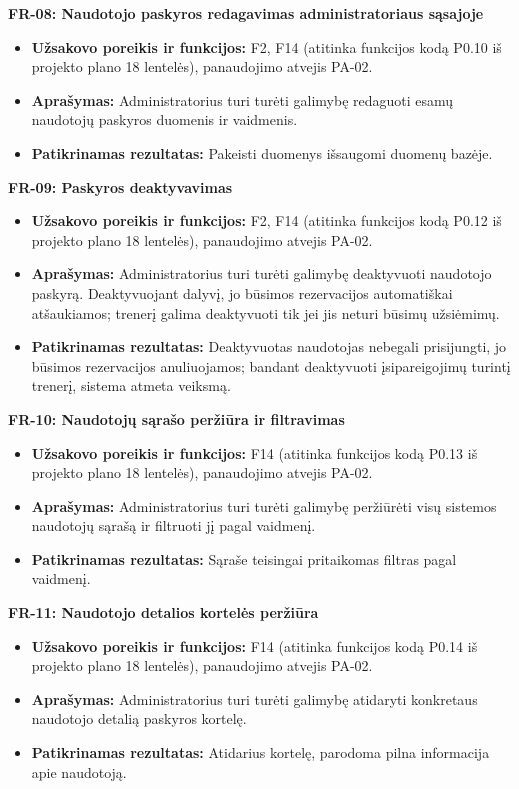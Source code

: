 \vspace{0.3cm}
\noindent\textbf{FR-08: Naudotojo paskyros redagavimas administratoriaus sąsajoje}
\begin{itemize}
    \item \textbf{Užsakovo poreikis ir funkcijos:} F2, F14 (atitinka funkcijos kodą P0.10 iš projekto plano 18 lentelės), panaudojimo atvejis PA-02.
    \item \textbf{Aprašymas:} Administratorius turi turėti galimybę redaguoti esamų naudotojų paskyros duomenis ir vaidmenis.
    \item \textbf{Patikrinamas rezultatas:} Pakeisti duomenys išsaugomi duomenų bazėje.
\end{itemize}

\vspace{0.3cm}
\noindent\textbf{FR-09: Paskyros deaktyvavimas}
\begin{itemize}
    \item \textbf{Užsakovo poreikis ir funkcijos:} F2, F14 (atitinka funkcijos kodą P0.12 iš projekto plano 18 lentelės), panaudojimo atvejis PA-02.
    \item \textbf{Aprašymas:} Administratorius turi turėti galimybę deaktyvuoti naudotojo paskyrą. Deaktyvuojant dalyvį, jo būsimos rezervacijos automatiškai atšaukiamos; trenerį galima deaktyvuoti tik jei jis neturi būsimų užsiėmimų.
    \item \textbf{Patikrinamas rezultatas:} Deaktyvuotas naudotojas nebegali prisijungti, jo būsimos rezervacijos anuliuojamos; bandant deaktyvuoti įsipareigojimų turintį trenerį, sistema atmeta veiksmą.
\end{itemize}

\vspace{0.3cm}
\noindent\textbf{FR-10: Naudotojų sąrašo peržiūra ir filtravimas}
\begin{itemize}
    \item \textbf{Užsakovo poreikis ir funkcijos:} F14 (atitinka funkcijos kodą P0.13 iš projekto plano 18 lentelės), panaudojimo atvejis PA-02.
    \item \textbf{Aprašymas:} Administratorius turi turėti galimybę peržiūrėti visų sistemos naudotojų sąrašą ir filtruoti jį pagal vaidmenį.
    \item \textbf{Patikrinamas rezultatas:} Sąraše teisingai pritaikomas filtras pagal vaidmenį.
\end{itemize}

\vspace{0.3cm}
\noindent\textbf{FR-11: Naudotojo detalios kortelės peržiūra}
\begin{itemize}
    \item \textbf{Užsakovo poreikis ir funkcijos:} F14 (atitinka funkcijos kodą P0.14 iš projekto plano 18 lentelės), panaudojimo atvejis PA-02.
    \item \textbf{Aprašymas:} Administratorius turi turėti galimybę atidaryti konkretaus naudotojo detalią paskyros kortelę.
    \item \textbf{Patikrinamas rezultatas:} Atidarius kortelę, parodoma pilna informacija apie naudotoją.
\end{itemize}

